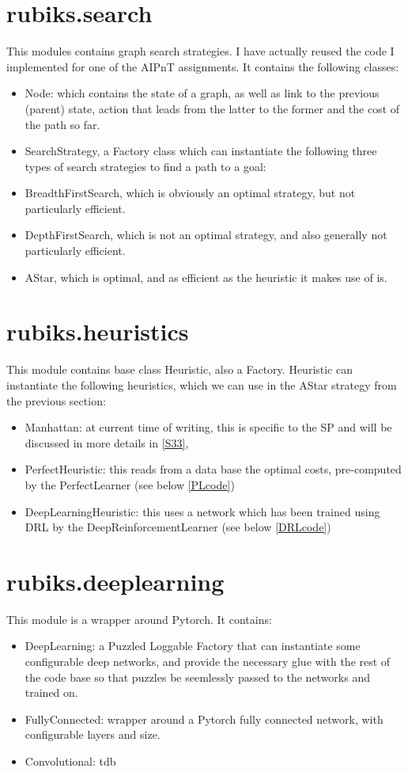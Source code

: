 \section{rubiks.search}
This modules contains graph search strategies. I have actually reused the code I implemented for one of the AIPnT assignments. It contains the following classes:
\begin{itemize}
\item Node: which contains the state of a graph, as well as link to the previous (parent) state, action that leads from the latter to the former and the cost of the path so far.
\item SearchStrategy, a Factory class which can instantiate the following three types of search strategies to find a path to a goal:
\item BreadthFirstSearch, which is obviously an optimal strategy, but not particularly efficient.
\item DepthFirstSearch, which is not an optimal strategy, and also generally not particularly efficient.
\item AStar, which is optimal, and as efficient as the heuristic it makes use of is.
\end{itemize}

\section{rubiks.heuristics}
\label{HSS}
This module contains base class Heuristic, also a Factory. Heuristic can instantiate the following heuristics, which we can use in the AStar strategy from the previous section:
\begin{itemize}
\item Manhattan: at current time of writing, this is specific to the SP and will be discussed in more details in \ref{S33},
\item PerfectHeuristic: this reads from a data base the optimal costs, pre-computed by the PerfectLearner (see below \ref{PLcode})
\item DeepLearningHeuristic: this uses a network which has been trained using DRL by the DeepReinforcementLearner (see below \ref{DRLcode})
\end{itemize}



\section{rubiks.deeplearning}
This module is a wrapper around Pytorch. It contains:
\begin{itemize}
\item DeepLearning: a Puzzled Loggable Factory that can instantiate some configurable deep networks, and provide the necessary glue with the rest of the code base so that puzzles be seemlessly passed to the networks and trained on.
\item FullyConnected: wrapper around a Pytorch fully connected network, with configurable layers and size.
\item Convolutional: tdb
\end{itemize}


